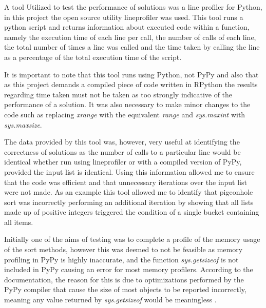 \documentclass[12pt]{article}
\begin{document}
A tool Utilized to test the performance of solutions was a line profiler for Python, in this project the open source utility line\textunderscore profiler \cite{lineprof} was used. This tool runs a python script and returns information about executed code within a function, namely the execution time of each line per call, the number of calls of each line, the total number of times a line was called and the time taken by calling the line as a percentage of the total execution time of the script.
\par 
It is important to note that this tool runs using Python, not PyPy and also that as this project demands a compiled piece of code written in RPython the results regarding time taken must not be taken as too strongly indicative of the performance of a solution. It was also necessary to make minor changes to the code such as replacing \textit{xrange} with the equivalent \textit{range} and \textit{sys.maxint} with \textit{sys.maxsize}.
\par 
The data provided by this tool was, however, very useful at identifying the correctness of solutions as the number of calls to a particular line would be identical whether run using line\textunderscore profiler or with a compiled version of PyPy, provided the input list is identical. Using this information allowed me to ensure that the code was efficient and that unnecessary iterations over the input list were not made. As an example this tool allowed me to identify that pigeonhole sort was incorrectly performing an additional iteration by showing that all lists made up of positive integers triggered the condition of a single bucket containing all items.
\par
Initially one of the aims of testing was to complete a profile of the memory usage of the sort methods, however this was deemed to not be feasible as memory profiling in PyPy is highly inaccurate, and the function \textit{sys.getsizeof} is not included in PyPy causing an error for most memory profilers. According to the documentation, the reason for this is due to optimizations performed by the PyPy compiler that cause the size of most objects to be reported incorrectly, meaning any value returned by \textit{sys.getsizeof} would be meaningless \cite{pypymem}.
\end{document}
